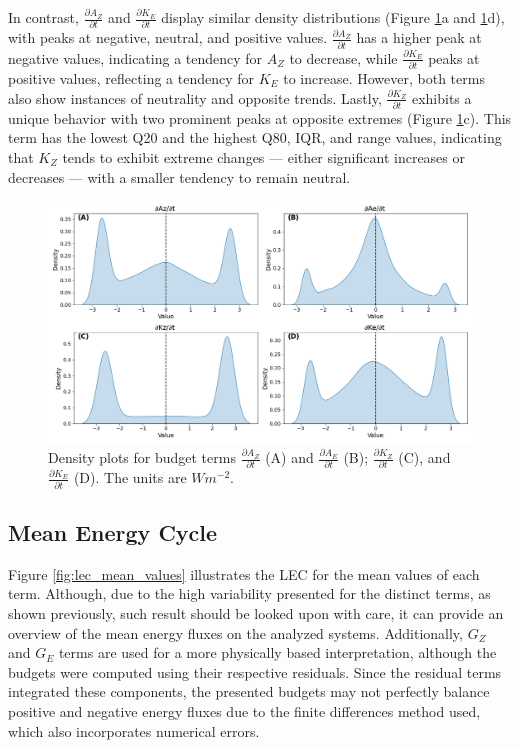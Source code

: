 In contrast, $\frac{\partial A_Z}{\partial t}$ and $\frac{\partial K_E}{\partial t}$ display similar density distributions (Figure \ref{fig:ridge_plot_Budgets_total}a and \ref{fig:ridge_plot_Budgets_total}d), with peaks at negative, neutral, and positive values. $\frac{\partial A_Z}{\partial t}$ has a higher peak at negative values, indicating a tendency for $A_Z$ to decrease, while $\frac{\partial K_E}{\partial t}$ peaks at positive values, reflecting a tendency for $K_E$ to increase. However, both terms also show instances of neutrality and opposite trends. Lastly, $\frac{\partial K_Z}{\partial t}$ exhibits a unique behavior with two prominent peaks at opposite extremes (Figure \ref{fig:ridge_plot_Budgets_total}c). This term has the lowest Q20 and the highest Q80, IQR, and range values, indicating that $K_Z$ tends to exhibit extreme changes — either significant increases or decreases — with a smaller tendency to remain neutral.


\begin{figure}[!htbp]
\centering
\includegraphics[width=\textwidth]{figs_5/ridge_plot_Budgets_total.png}
\caption[Density Plots - Budget Terms]{Density plots for budget terms $\frac{\partial A_Z}{\partial t}$ (A) and $\frac{\partial A_E}{\partial t}$ (B); $\frac{\partial K_Z}{\partial t}$ (C), and $\frac{\partial K_E}{\partial t}$ (D). The units are $W m^{-2}$.}
\label{fig:ridge_plot_Budgets_total}
\end{figure}

\subsection{Mean Energy Cycle}\label{sec:lec_mean}

Figure \ref{fig:lec_mean_values} illustrates the LEC for the mean values of each term. Although, due to the high variability presented for the distinct terms, as shown previously, such result should be looked upon with care, it can provide an overview of the mean energy fluxes on the analyzed systems. Additionally, $G_Z$ and $G_E$ terms are used for a more physically based interpretation, although the budgets were computed using their respective residuals. Since the residual terms integrated these components, the presented budgets may not perfectly balance positive and negative energy fluxes due to the finite differences method used, which also incorporates numerical errors.

